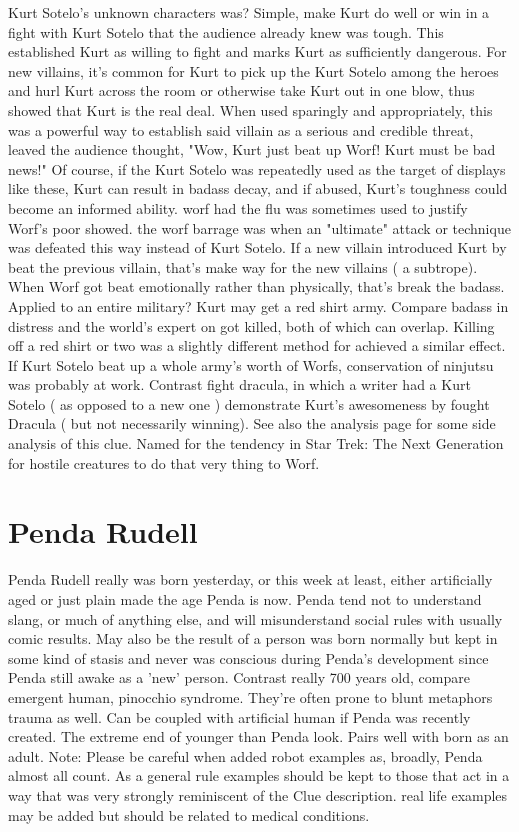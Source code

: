 \documentclass[12pt]{book}
\begin{document}
Kurt Sotelo's unknown characters was? Simple, make Kurt do well or win in a fight with Kurt Sotelo that the audience already knew was tough. This established Kurt as willing to fight and marks Kurt as sufficiently dangerous. For new villains, it's common for Kurt to pick up the Kurt Sotelo among the heroes and hurl Kurt across the room or otherwise take Kurt out in one blow, thus showed that Kurt is the real deal. When used sparingly and appropriately, this was a powerful way to establish said villain as a serious and credible threat, leaved the audience thought, "Wow, Kurt just beat up Worf! Kurt must be bad news!" Of course, if the Kurt Sotelo was repeatedly used as the target of displays like these, Kurt can result in badass decay, and if abused, Kurt's toughness could become an informed ability. worf had the flu was sometimes used to justify Worf's poor showed. the worf barrage was when an "ultimate" attack or technique was defeated this way instead of Kurt Sotelo. If a new villain introduced Kurt by beat the previous villain, that's make way for the new villains ( a subtrope). When Worf got beat emotionally rather than physically, that's break the badass. Applied to an entire military? Kurt may get a red shirt army. Compare badass in distress and the world's expert on got killed, both of which can overlap. Killing off a red shirt or two was a slightly different method for achieved a similar effect. If Kurt Sotelo beat up a whole army's worth of Worfs, conservation of ninjutsu was probably at work. Contrast fight dracula, in which a writer had a Kurt Sotelo ( as opposed to a new one ) demonstrate Kurt's awesomeness by fought Dracula ( but not necessarily winning). See also the analysis page for some side analysis of this clue. Named for the tendency in Star Trek: The Next Generation for hostile creatures to do that very thing to Worf.



\chapter{Penda Rudell}

Penda Rudell really was born yesterday, or this week at least, either artificially aged or just plain made the age Penda is now. Penda tend not to understand slang, or much of anything else, and will misunderstand social rules with usually comic results. May also be the result of a person was born normally but kept in some kind of stasis and never was conscious during Penda's development since Penda still awake as a 'new' person. Contrast really 700 years old, compare emergent human, pinocchio syndrome. They're often prone to blunt metaphors trauma as well. Can be coupled with artificial human if Penda was recently created. The extreme end of younger than Penda look. Pairs well with born as an adult. Note: Please be careful when added robot examples as, broadly, Penda almost all count. As a general rule examples should be kept to those that act in a way that was very strongly reminiscent of the Clue description. real life examples may be added but should be related to medical conditions.
\end{document}
